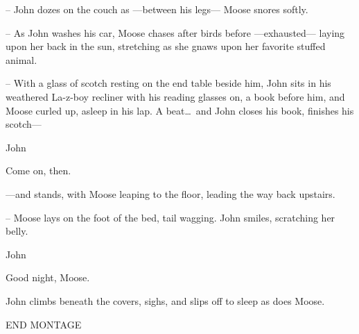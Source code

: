 \documentclass[letterpaper,literary]{screenwriter}
\begin{document}
-- John dozes on the couch as ---between his legs--- Moose snores softly.

-- As John washes his car, Moose chases after birds before
---exhausted--- laying upon her back in the sun, stretching as she gnaws
upon her favorite stuffed animal.

-- With a glass of scotch resting on the end table beside him, John sits
in his weathered La-z-boy recliner with his reading glasses on, a book
before him, and Moose curled up, asleep in his lap.  A beat\dots\ and
John closes his book, finishes his scotch---

\begin{dialogue}{John}

    Come on, then.

\end{dialogue}

---and stands, with Moose leaping to the floor, leading the way back
upstairs.

-- Moose lays on the foot of the bed, tail wagging.  John smiles,
scratching her belly.

\begin{dialogue}{John \contd}

Good night, Moose.

\end{dialogue}

John climbs beneath the covers, sighs, and slips off to sleep as does
Moose.

END MONTAGE

\fadeout
\end{document}
